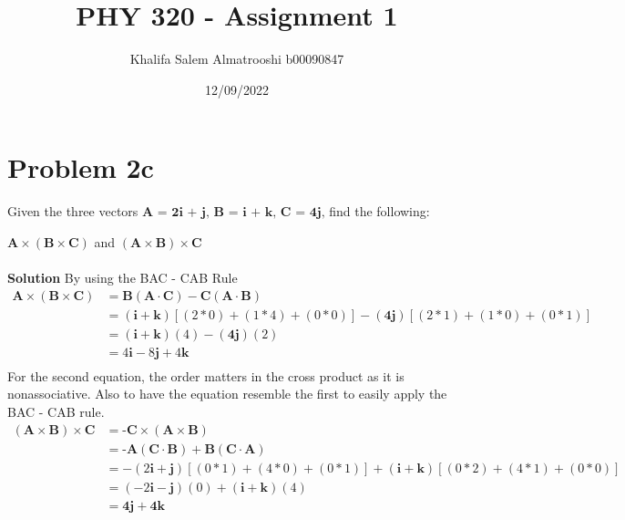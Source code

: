 \documentclass[]{article}
\title{PHY 320 - Assignment 1}
\author{Khalifa Salem Almatrooshi b00090847}
\date{12/09/2022}
\newcommand{\bd}{\textbf}
\newcommand{\ih}{\bd{i}}
\newcommand{\jh}{\bd{j}}
\newcommand{\kh}{\bd{k}}
\begin{document}
	
\maketitle

\section{Problem 2c}
Given the three vectors
$ \bd{A = 2i + j, B = i + k, C = 4j,} $
find the following:

$ \bd{A} \times (\bd{B} \times \bd{C}) $ and $ (\bd{A} \times \bd{B}) \times \bd{C} $
\\\\
\bd{Solution} By using the BAC - CAB Rule
\begin{equation}
\begin{split}
\bd{A} \times (\bd{B} \times \bd{C}) &= \bd{B}(\bd{A} \cdot \bd{C}) - \bd{C}(\bd{A} \cdot \bd{B}) \\
&=(\ih + \kh)[(2 * 0) + (1 * 4) + (0 * 0)] - (\bd{4j})[(2 * 1) + (1 * 0) + (0 * 1)] \\
&=(\ih + \kh)(4) - (\bd{4j})(2) \\
&=4\ih - 8\jh + 4\kh \\
\end{split}
\end{equation}
For the second equation, the order matters in the cross product as it is nonassociative. Also to have the equation resemble the first to easily apply the BAC - CAB rule.
\begin{equation}
\begin{split}
(\bd{A} \times \bd{B}) \times \bd{C} &= \bd{-C} \times (\bd{A} \times \bd{B}) \\
&=\bd{-A}(\bd{C} \cdot \bd{B}) + \bd{B}(\bd{C} \cdot \bd{A}) \\
&=-(2\ih + \jh)[(0 * 1) + (4 * 0) + (0 * 1)] + (\ih + \kh)[(0 * 2) + (4 * 1) + (0 * 0)] \\
&=(-2\ih - \jh)(0) + (\ih + \kh)(4) \\
&=\bd{4j} + \bd{4k} \\
\end{split}
\end{equation}
\end{document}
